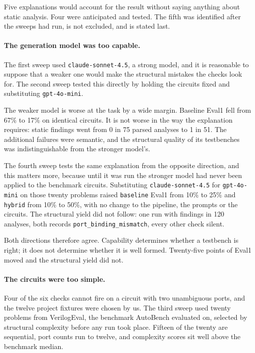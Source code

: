 \documentclass[11pt,a4paper,titlepage=false]{scrreprt}
\begin{document}
Five explanations would account for the result without saying anything about static
analysis. Four were anticipated and tested. The fifth was identified after the sweeps had
run, is not excluded, and is stated last.

\paragraph{The generation model was too capable.} The first sweep used
\texttt{claude-sonnet-4.5}, a strong model, and it is reasonable to suppose that a weaker
one would make the structural mistakes the checks look for. The second sweep tested this
directly by holding the circuits fixed and substituting \texttt{gpt-4o-mini}.

The weaker model is worse at the task by a wide margin. Baseline Eval1 fell from 67\% to
17\% on identical circuits. It is not worse in the way the explanation requires: static
findings went from 0 in 75 parsed analyses to 1 in 51. The additional failures were semantic, and
the structural quality of its testbenches was indistinguishable from the stronger model's.

The fourth sweep tests the same explanation from the opposite direction, and this matters
more, because until it was run the stronger model had never been applied to the benchmark
circuits. Substituting \texttt{claude-sonnet-4.5} for \texttt{gpt-4o-mini} on those twenty
problems raised \texttt{baseline} Eval1 from 10\% to 25\% and \texttt{hybrid} from 10\% to
50\%, with no change to the pipeline, the prompts or the circuits. The structural yield did
not follow: one run with findings in 120 analyses, both records
\texttt{port\_binding\_mismatch}, every other check silent.

Both directions therefore agree. Capability determines whether a testbench is right; it does
not determine whether it is well formed. Twenty-five points of Eval1 moved and the structural
yield did not.

\paragraph{The circuits were too simple.} Four of the six checks cannot fire on a circuit
with two unambiguous ports, and the twelve project fixtures were chosen by us. The third
sweep used twenty problems from VerilogEval, the benchmark AutoBench evaluated on, selected
by structural complexity before any run took place. Fifteen of the twenty are sequential,
port counts run to twelve, and complexity scores sit well above the benchmark median.
\end{document}
